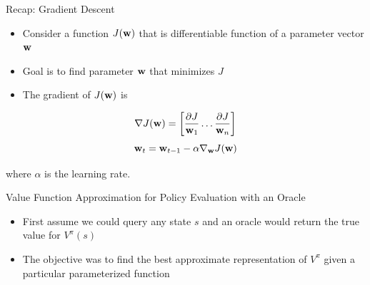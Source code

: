 \documentclass[aspectratio=169]{../latex_main/tntbeamer}  %
\begin{document}
\begin{frame}[c]{Recap: Gradient Descent}
	
	
	\begin{itemize}
		\item Consider a function $J(\mathbf{w})$ that is differentiable function of a parameter vector $\mathbf{w}$
		\item Goal is to find parameter $\mathbf{w}$ that minimizes $J$
		\item The gradient of $J(\mathbf{w})$ is 
	\end{itemize}
	$$
	\nabla J(\mathbf{w}) = \left[ \frac{\partial J}{\mathbf{w}_1} \ldots \frac{\partial J}{\mathbf{w}_n} \right]
	$$
	$$\mathbf{w}_t = \mathbf{w}_{t-1} - \alpha \nabla_{\mathbf{w}} J(\mathbf{w})$$
	
	where $\alpha$ is the learning rate.

	
\end{frame}
\begin{frame}[c]{Value Function Approximation for Policy Evaluation with
		an Oracle}
	
	
	\begin{itemize}
		\item First assume we could query any state $s$ and an \alert{oracle} would return
		the true value for $V^\pi (s)$
		\item The objective was to find the best approximate representation of $V^\pi$
		given a particular parameterized function
	\end{itemize}
	
\end{frame}
\end{document}
